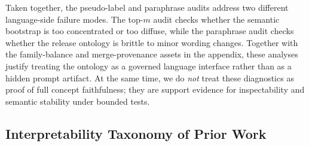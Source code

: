 Taken together, the pseudo-label and paraphrase audits address two different
language-side failure modes. The top-$m$ audit checks whether the semantic
bootstrap is too concentrated or too diffuse, while the paraphrase audit checks
whether the release ontology is brittle to minor wording changes. Together
with the family-balance and merge-provenance assets in the appendix, these
analyses justify treating the ontology as a governed language interface rather
than as a hidden prompt artifact. At the same time, we do \emph{not} treat
these diagnostics as proof of full concept faithfulness; they are support
evidence for inspectability and semantic stability under bounded tests.

\subsection{Interpretability Taxonomy of Prior Work}

\begin{table}[t]
\caption{[Controlled support evidence] Interpretability taxonomy for accident anticipation. The point of this
table is not that every method should expose the same type of explanation, but
that most prior systems still lack an explicit semantic interface that can be
trained, audited, and compared across runs.}
\label{tab:interp_comparison}
\centering\footnotesize
\TableStyleOn
\setlength{\tabcolsep}{4pt}
\TableStyleOff
\end{table}

